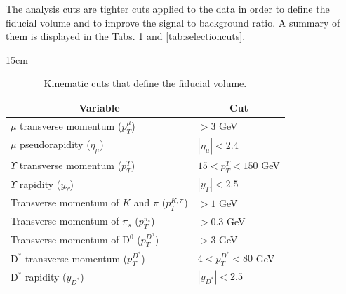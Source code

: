The analysis cuts are tighter cuts applied to the data in order to define the fiducial volume and to improve the signal to background ratio. A summary of them is displayed in the Tabs. \ref{tab:fiducialvol} and \ref{tab:selectioncuts}.

\begin{table}[!htbp]{15cm}
  \caption{Kinematic cuts that define the fiducial volume.}
  \begin{tabular}{ l | l }
    \hline
    \multicolumn{1}{c|}{Variable}                         & \multicolumn{1}{|c}{Cut}      \\ \hline
    $\mu$ transverse momentum ($p_T^\mu$)                 & $> 3$ GeV                     \\ \hline
    $\mu$ pseudorapidity ($\eta_\mu$)                     & $|\eta_\mu| < 2.4$            \\ \hline
    $\Upsilon$ transverse momentum ($p_T^\Upsilon$)       & $15 < p_T^\Upsilon < 150$ GeV \\ \hline
    $\Upsilon$ rapidity ($y_\Upsilon$)                    & $|y_\Upsilon| < 2.5$          \\ \hline
    Transverse momentum of $K$ and $\pi$ ($p_T^{K, \pi}$) & $> 1$ GeV                     \\ \hline
    Transverse momentum of $\pi_s$ ($p_T^{\pi_s}$)        & $> 0.3$ GeV                   \\ \hline
    Transverse momentum of D$^0$ ($p_T^{D^0}$)            & $> 3$ GeV                     \\ \hline
    D$^*$ transverse momentum ($p_T^{D^*}$)               & $4 < p_T^{D^*} < 80$ GeV      \\ \hline
    D$^*$ rapidity ($y_{D^*}$)                            & $|y_{D^*}| < 2.5$             \\ \hline
  \end{tabular}
  \label{tab:fiducialvol}
\end{table}

